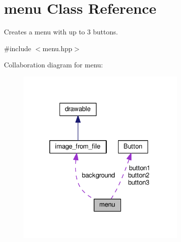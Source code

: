 \hypertarget{classmenu}{}\section{menu Class Reference}
\label{classmenu}


Creates a menu with up to 3 buttons.  




{\ttfamily \#include $<$menu.\+hpp$>$}



Collaboration diagram for menu\+:\nopagebreak
\begin{figure}[H]
\begin{center}
\leavevmode
\includegraphics[width=234pt]{classmenu__coll__graph}
\end{center}
\end{figure}
